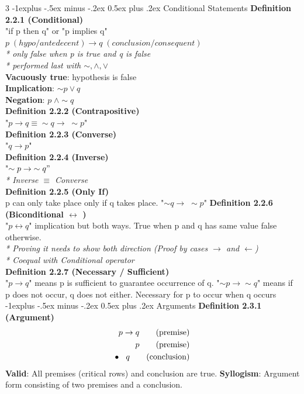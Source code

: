 \documentclass[10pt,landscape]{article}
\makeatletter
\renewcommand{\subsection}{\@startsection{subsection}{2}{0mm}%
    {-1explus -.5ex minus -.2ex}%
    {0.5ex plus .2ex}%
    {\normalfont\normalsize\bfseries}}
\makeatother
\begin{document}
\begin{multicols}{3}
    \subsection{Conditional Statements}
    \textbf{Definition 2.2.1 (Conditional)} \\
    "if p then q" or "p implies q" \\
    $p\;(hypo / antedecent) \rightarrow q\;(conclusion / consequent)$ \\
    \textit{* only false when p is true and q is false} \\
    \textit{* performed last with $\sim, \land, \lor$} \\
    \textbf{Vacuously true}: hypothesis is false \\
    \textbf{Implication}: $\sim p \lor q$ \\
    \textbf{Negation}: $p\; \land \sim q$ \\
    \textbf{Definition 2.2.2 (Contrapositive)} \\
    "$p \rightarrow q \equiv \sim q \rightarrow \; \sim p$" \\
    \textbf{Definition 2.2.3 (Converse)} \\
    "$q \rightarrow p$" \\
    \textbf{Definition 2.2.4 (Inverse)} \\
    "$\sim p \rightarrow \; \sim q"$ \\
    \textit{* Inverse $\equiv$ Converse} \\
    \textbf{Definition 2.2.5 (Only If)} \\
    p can only take place only if q takes place. "$\sim q \rightarrow \; \sim p$"
    \textbf{Definition 2.2.6 (Biconditional $\leftrightarrow$ )} \\
    "$p \leftrightarrow q$" implication but both ways. True when p and q has same value false otherwise. \\
    \textit{* Proving it needs to show both direction (Proof by cases $\rightarrow$ and $\leftarrow$)} \\
    \textit{* Coequal with Conditional operator} \\
    \textbf{Definition 2.2.7 (Necessary / Sufficient)} \\
    "$p \rightarrow q$" means p is sufficient to guarantee occurrence of q.
    "$\sim p \rightarrow \sim q$" means if p does not occur, q does not either. Necessary for p to occur when q occurs \\
    \subsection{Arguments}
    \textbf{Definition 2.3.1 (Argument)} \\
    \begin{align}
        p \rightarrow q \tag{premise} \\
        p \tag{premise}               \\
        \bullet \hspace{0.3cm} q \tag{conclusion}
    \end{align}
    \textbf{Valid}: All premises (critical rows) and conclusion are true.
    \textbf{Syllogism}: Argument form consisting of two premises and a conclusion.

\end{multicols}
\end{document}
